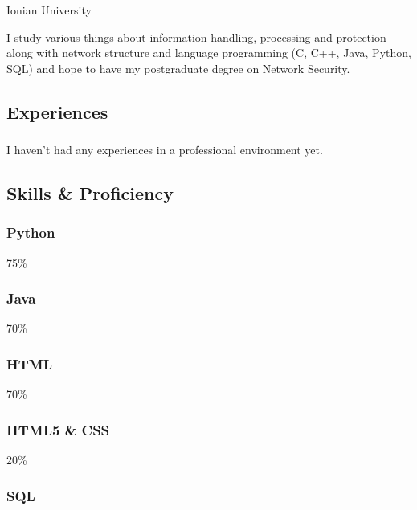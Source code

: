 \documentclass[]{article}
\begin{document}
Ionian University

I study various things about information handling, processing and
protection along with network structure and language programming (C,
C++, Java, Python, SQL) and hope to have my postgraduate degree on
Network Security.

\subsection{\texorpdfstring{{ \emph{} \emph{} }
Experiences}{    Experiences}}\label{experiences}

\subsubsection{}\label{section}

I haven't had any experiences in a professional environment yet.

\subsection{\texorpdfstring{{ \emph{} \emph{} } Skills \&
Proficiency}{    Skills \& Proficiency}}\label{skills-proficiency}

\subsubsection{Python}\label{python}

75\%

\subsubsection{Java}\label{java}

70\%

\subsubsection{HTML}\label{html}

70\%

\subsubsection{HTML5 \& CSS}\label{html5-css}

20\%

\subsubsection{SQL}\label{sql}
\end{document}

